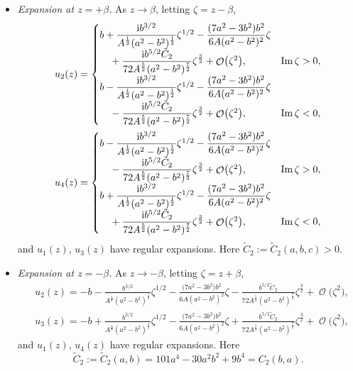 \documentclass[pdftex]{sigma}
\DeclareMathOperator{\OO}{\mathcal{O}}
\numberwithin{equation}{section}
\begin{document}
 \begin{itemize}\itemsep=0pt
 \item \textit{Expansion at $z= +\beta$.}
 As $z\to \beta$, letting $\zeta = z-\beta$,
 \begin{align*}
 &u_2(z)=
 \begin{cases}
 b+ \dfrac{{\rm i}b^{3/2}}{A^{\frac{1}{2}}(a^2-b^2)^{\frac{1}{2}}}\zeta^{1/2} -\dfrac{(7a^2 - 3b^2)b^2}{6A(a^2 - b^2)^2} \zeta &\\
 \quad{} + \dfrac{{\rm i}b^{5/2}\tilde{C}_2}{72A^{\frac{5}{2}}(a^2-b^2)^{\frac{7}{2}}}\zeta^{\frac{3}{2}} + \OO\bigl(\zeta^2\bigr), & \operatorname{Im}\zeta > 0, \\[2mm]
 b -\dfrac{{\rm i}b^{3/2}}{A^{\frac{1}{2}}(a^2-b^2)^{\frac{1}{2}}}\zeta^{1/2} -\dfrac{(7a^2 - 3b^2)b^2}{6A(a^2 - b^2)^2} \zeta & \\
 \quad {} - \dfrac{{\rm i}b^{5/2}\tilde{C}_2}{72A^{\frac{5}{2}}(a^2-b^2)^{\frac{7}{2}}}\zeta^{\frac{3}{2}} + \OO\bigl(\zeta^2\bigr), & \operatorname{Im}\zeta < 0,
 \end{cases}\\
 &u_4(z)=
 \begin{cases}
 b -\dfrac{{\rm i}b^{3/2}}{A^{\frac{1}{2}}(a^2-b^2)^{\frac{1}{2}}}\zeta^{1/2} -\dfrac{(7a^2 - 3b^2)b^2}{6A(a^2 - b^2)^2} \zeta &\\
 \quad {}- \dfrac{{\rm i}b^{5/2}\tilde{C}_2}{72A^{\frac{5}{2}}(a^2-b^2)^{\frac{7}{2}}}\zeta^{\frac{3}{2}} + \OO\bigl(\zeta^2\bigr), & \operatorname{Im}\zeta > 0, \\[2mm]
 b + \dfrac{{\rm i}b^{3/2}}{A^{\frac{1}{2}}(a^2-b^2)^{\frac{1}{2}}}\zeta^{1/2} -\dfrac{(7a^2 - 3b^2)b^2}{6A(a^2 - b^2)^2} \zeta & \\
 \quad{} + \dfrac{{\rm i}b^{5/2}\tilde{C}_2}{72A^{\frac{5}{2}}(a^2-b^2)^{\frac{7}{2}}}\zeta^{\frac{3}{2}} + \OO\bigl(\zeta^2\bigr), & \operatorname{Im}\zeta < 0,
 \end{cases}
 \end{align*}
 and $u_1(z)$, $u_3(z)$ have regular expansions. Here
$\tilde{C}_2 := \tilde{C}_2(a,b,c)>0$.

 \item \textit{Expansion at $z= - \beta$.}
 As $z\to -\beta$, letting $\zeta = z+\beta$,
 \begin{align*}
 &u_2(z)= -b-\frac{b^{3/2}}{A^{\frac{1}{2}}(a^2-b^2)^{\frac{1}{2}}}\zeta^{1/2} -\frac{\bigl(7a^2 - 3b^2\bigr)b^2}{6A(a^2 - b^2)^2} \zeta - \frac{b^{5/2}\tilde{C}_2}{72A^{\frac{5}{2}}(a^2-b^2)^{\frac{7}{2}}}\zeta^{\frac{3}{2}} + \OO\bigl(\zeta^2\bigr),\\
 &u_3(z)= -b +\frac{b^{3/2}}{A^{\frac{1}{2}}(a^2-b^2)^{\frac{1}{2}}}\zeta^{1/2} -\frac{\bigl(7a^2 - 3b^2\bigr)b^2}{6A(a^2 - b^2)^2} \zeta + \frac{b^{5/2}\tilde{C}_2}{72A^{\frac{5}{2}}(a^2-b^2)^{\frac{7}{2}}}\zeta^{\frac{3}{2}} + \OO\bigl(\zeta^2\bigr),
 \end{align*}
 and $u_1(z)$, $u_4(z)$ have regular expansions. Here
 \[
 \tilde{C}_2 := \tilde{C}_2(a,b)= 101a^4 - 30a^2b^2 + 9b^4 = C_2(b,a).
 \]
 \end{itemize}
\end{document}
